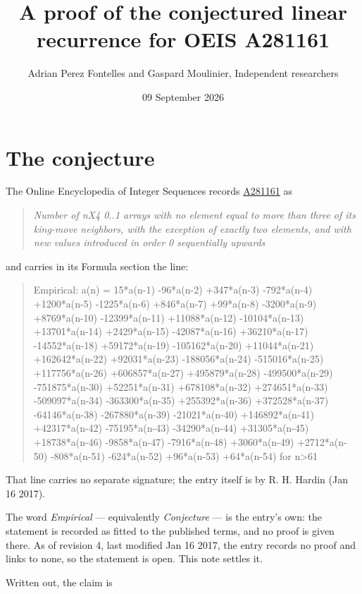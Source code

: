 \documentclass[11pt]{article}
\title{A proof of the conjectured linear recurrence for OEIS A281161}
\author{Adrian Perez Fontelles and Gaspard Moulinier, Independent researchers}
\date{09 September 2026}
\theoremstyle{definition}
\begin{document}
\maketitle
\section{The conjecture}

The Online Encyclopedia of Integer Sequences records \href{https://oeis.org/A281161}{A281161} as

\begin{quote}\itshape Number of nX4 0..1 arrays with no element equal to more than three of its king-move neighbors, with the exception of exactly two elements, and with new values introduced in order 0 sequentially upwards\end{quote}

and carries in its Formula section the line:

\begin{quote}\ttfamily Empirical: a(n) = 15*a(n-1) -96*a(n-2) +347*a(n-3) -792*a(n-4) +1200*a(n-5) -1225*a(n-6) +846*a(n-7) +99*a(n-8) -3200*a(n-9) +8769*a(n-10) -12399*a(n-11) +11088*a(n-12) -10104*a(n-13) +13701*a(n-14) +2429*a(n-15) -42087*a(n-16) +36210*a(n-17) -14552*a(n-18) +59172*a(n-19) -105162*a(n-20) +11044*a(n-21) +162642*a(n-22) +92031*a(n-23) -188056*a(n-24) -515016*a(n-25) +117756*a(n-26) +606857*a(n-27) +495879*a(n-28) -499500*a(n-29) -751875*a(n-30) +52251*a(n-31) +678108*a(n-32) +274651*a(n-33) -509097*a(n-34) -363300*a(n-35) +255392*a(n-36) +372528*a(n-37) -64146*a(n-38) -267880*a(n-39) -21021*a(n-40) +146892*a(n-41) +42317*a(n-42) -75195*a(n-43) -34290*a(n-44) +31305*a(n-45) +18738*a(n-46) -9858*a(n-47) -7916*a(n-48) +3060*a(n-49) +2712*a(n-50) -808*a(n-51) -624*a(n-52) +96*a(n-53) +64*a(n-54) for n>61\end{quote}

That line carries no separate signature; the entry itself is by R. H. Hardin (Jan 16 2017).

The word {\itshape Empirical} --- equivalently {\itshape Conjecture} --- is the entry's own: the statement is recorded as fitted to the published terms, and no proof is given there. As of revision 4, last modified Jan 16 2017, the entry records no proof and links to none, so the statement is open. This note settles it.

Written out, the claim is
\end{document}
